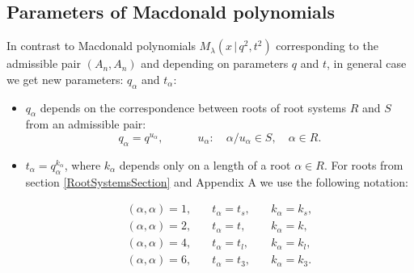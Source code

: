 \documentclass{article}
\begin{document}
\subsection{Parameters of Macdonald polynomials \label{ParmSec}}
In contrast to  Macdonald polynomials $M_{\lambda} (x\,|\,q^2,t^2)$ \cite{Mac0,Mac01} corresponding to the admissible pair $(A_n,A_n)$ and depending on parameters $q$ and $t$, in general case we get new parameters: $q_{\alpha}$ and $t_{\alpha}$:
\begin{itemize}
    \item $q_{\alpha}$ depends on the correspondence between roots of root systems $R$ and $S$ from an admissible pair:
\begin{equation}
    q_{\alpha} = q^{ u_{\alpha}}, \quad\quad\quad u_{\alpha}:\quad \alpha/u_{\alpha} \in S, \quad \alpha \in R. \label{uparm}
\end{equation}
\item ${t_{\alpha} = q_{\alpha}^{ k_{\alpha}}}$, where $k_{\alpha}$ depends only on a length of a root $\alpha \in R$. For roots from section \ref{RootSystemsSection} and Appendix A we use the following notation:

\begin{equation}
    \begin{array}{lll}
         (\alpha,\alpha) = 1, &\quad  t_{\alpha}  = t_s, &\quad  k_{\alpha}  = k_s,\\
    (\alpha,\alpha) = 2, &  \quad  t_{\alpha}  = t, & \quad  k_{\alpha}  = k,\\
     (\alpha,\alpha) = 4, & \quad t_{\alpha}  = t_l, & \quad k_{\alpha}  = k_l,\\
     (\alpha,\alpha) = 6, & \quad t_{\alpha}  = t_3, & \quad k_{\alpha}  = k_3. \\
    \end{array}
\end{equation}
\end{itemize}
\end{document}
